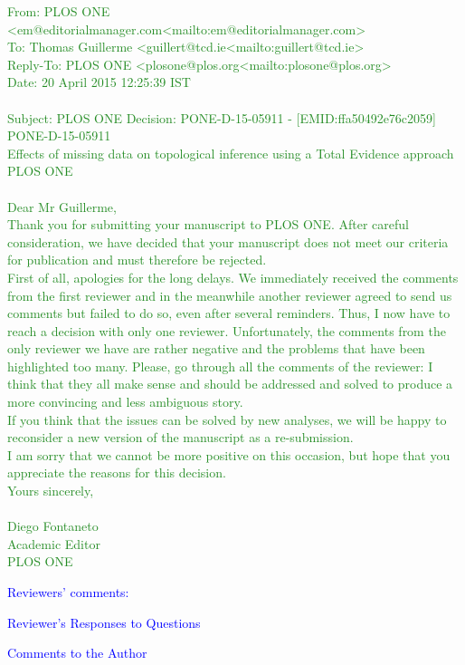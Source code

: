 \documentclass[11pt]{letter}
\begin{document}
\begin{letter}{}
\textcolor{ForestGreen}{From: PLOS ONE <em@editorialmanager.com<mailto:em@editorialmanager.com> \\
To: Thomas Guillerme <guillert@tcd.ie<mailto:guillert@tcd.ie> \\
Reply-To: PLOS ONE <plosone@plos.org<mailto:plosone@plos.org> \\
Date: 20 April 2015 12:25:39 IST \\ \\
Subject: PLOS ONE Decision: PONE-D-15-05911 - [EMID:ffa50492e76c2059] \\
PONE-D-15-05911 \\
Effects of missing data on topological inference using a Total Evidence approach \\
PLOS ONE \\ \\
Dear Mr Guillerme, \\
Thank you for submitting your manuscript to PLOS ONE. After careful consideration, we have decided that your manuscript does not meet our criteria for publication and must therefore be rejected. \\
First of all, apologies for the long delays. We immediately received the comments from the first reviewer and in the meanwhile another reviewer agreed to send us comments but failed to do so, even after several reminders. Thus, I now have to reach a decision with only one reviewer.
Unfortunately, the comments from the only reviewer we have are rather negative and the problems that have been highlighted too many. Please, go through all the comments of the reviewer: I think that they all make sense and should be addressed and solved to produce a more convincing and less ambiguous story. \\
If you think that the issues can be solved by new analyses, we will be happy to reconsider a new version of the manuscript as a re-submission. \\
I am sorry that we cannot be more positive on this occasion, but hope that you appreciate the reasons for this decision. \\
Yours sincerely, \\ \\
Diego Fontaneto \\ 
Academic Editor \\
PLOS ONE}

\textcolor{blue}{Reviewers' comments:}

\textcolor{blue}{Reviewer's Responses to Questions}

\textcolor{blue}{Comments to the Author}


\end{letter}
\end{document}
